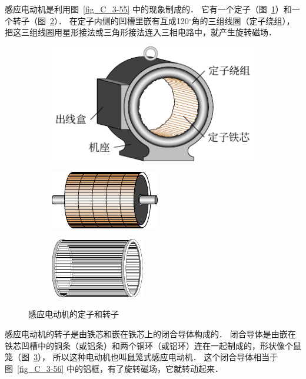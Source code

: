 感应电动机是利用图~\ref{fig_C_3-55} 中的现象制成的．
它有一个定子（图~\ref{fig_C_3-57a}）和一个转子（图~\ref{fig_C_3-57b}）．
在定子内侧的凹槽里嵌有互成120$^\circ$角的三组线圈（定子绕组），把这三组线圈用星形接法或三角形接法连入三相电路中，就产生旋转磁场．
\begin{figure}[htbp]
    \centering
    \begin{subfigure}{0.4\linewidth}
        \centering
        \includegraphics{fig/C/3-57a.pdf}
        \caption{}\label{fig_C_3-57a}
    \end{subfigure}
    \hfil
    \begin{subfigure}{0.25\linewidth}
        \centering
        \includegraphics{fig/C/3-57b.pdf}
        \caption{}\label{fig_C_3-57b}
    \end{subfigure}
    \hfil
    \begin{subfigure}{0.25\linewidth}
        \centering
        \includegraphics{fig/C/3-57c.pdf}
        \caption{}\label{fig_C_3-57c}
    \end{subfigure}
\caption{感应电动机的定子和转子}\label{fig_C_3-57}
\end{figure}

感应电动机的转子是由铁芯和嵌在铁芯上的闭合导体构成的．
闭合导体是由嵌在铁芯凹槽中的铜条（或铝条）和两个铜环（或铝环）连在一起制成的，形状像个鼠笼（图~\ref{fig_C_3-57c}），
所以这种电动机也叫鼠笼式感应电动机．
这个闭合导体相当于图~\ref{fig_C_3-56} 中的铝框，有了旋转磁场，它就转动起来．

